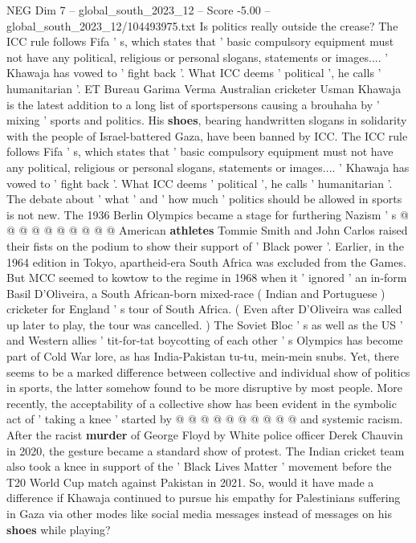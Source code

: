 \begin{textsample}{NEG Dim 7 – global\_south\_2023\_12 – Score -5.00 – global\_south\_2023\_12/104493975.txt}  \label{ex:f7_neg_416}
Is politics really outside the crease?
The ICC rule follows Fifa ' s, which states that ' basic compulsory equipment must not have any political, religious or personal slogans, statements or images.... ' Khawaja has vowed to ' fight back '.
What ICC deems ' political ', he calls ' humanitarian '.
ET Bureau Garima Verma Australian cricketer Usman Khawaja is the latest addition to a long list of sportspersons causing a brouhaha by ' mixing ' sports and politics.
His \textbf{shoes}, bearing handwritten slogans in solidarity with the people of Israel-battered Gaza, have been banned by ICC.
The ICC rule follows Fifa ' s, which states that ' basic compulsory equipment must not have any political, religious or personal slogans, statements or images.... ' Khawaja has vowed to ' fight back '.
What ICC deems ' political ', he calls ' humanitarian '.
The debate about ' what ' and ' how much ' politics should be allowed in sports is not new.
The 1936 Berlin Olympics became a stage for furthering Nazism ' s @ @ @ @ @ @ @ @ @ @ American \textbf{athletes} Tommie Smith and John Carlos raised their fists on the podium to show their support of ' Black power '.
Earlier, in the 1964 edition in Tokyo, apartheid-era South Africa was excluded from the Games.
But MCC seemed to kowtow to the regime in 1968 when it ' ignored ' an in-form Basil D'Oliveira, a South African-born mixed-race ( Indian and Portuguese ) cricketer for England ' s tour of South Africa. ( Even after D'Oliveira was called up later to play, the tour was cancelled. ) The Soviet Bloc ' s as well as the US ' and Western allies ' tit-for-tat boycotting of each other ' s Olympics has become part of Cold War lore, as has India-Pakistan tu-tu, mein-mein snubs.
Yet, there seems to be a marked difference between collective and individual show of politics in sports, the latter somehow found to be more disruptive by most people.
More recently, the acceptability of a collective show has been evident in the symbolic act of ' taking a knee ' started by @ @ @ @ @ @ @ @ @ @ and systemic racism.
After the racist \textbf{murder} of George Floyd by White police officer Derek Chauvin in 2020, the gesture became a standard show of protest.
The Indian cricket team also took a knee in support of the ' Black Lives Matter ' movement before the T20 World Cup match against Pakistan in 2021.
So, would it have made a difference if Khawaja continued to pursue his empathy for Palestinians suffering in Gaza via other modes like social media messages instead of messages on his \textbf{shoes} while playing?

\end{textsample}
